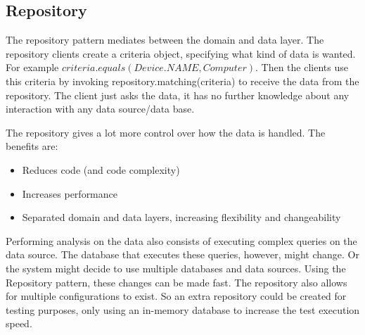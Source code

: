 \subsection{Repository}

The repository pattern mediates between the domain and data layer. The repository clients create a criteria object, specifying what kind of data is wanted. For example $criteria.equals(Device.NAME, Computer)$. Then the clients use this criteria by invoking repository.matching(criteria) to receive the data from the repository. The client just asks the data, it has no further knowledge about any interaction with any data source/data base.

The repository gives a lot more control over how the data is handled. The benefits are:
\begin{itemize}
\item Reduces code (and code complexity)
\item Increases performance
\item Separated domain and data layers, increasing flexibility and changeability
\end{itemize}

Performing analysis on the data also consists of executing complex queries on the data source. The database that executes these queries, however, might change. Or the system might decide to use multiple databases and data sources.
Using the Repository pattern, these changes can be made fast. The repository also allows for multiple configurations to exist. So an extra repository could be created for testing purposes, only using an in-memory database to increase the test execution speed.


